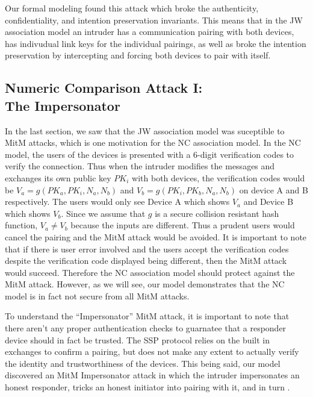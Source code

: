 \documentclass{acm_proc_article-sp}
\begin{document}
Our formal modeling found this attack which broke the authenticity, confidentiality, and intention preservation invariants. This means that in the JW association model an intruder has a communication pairing with both devices, has indivudual link keys for the individual pairings, as well as broke the intention preservation by intercepting and forcing both devices to pair with itself.

\subsection{Numeric Comparison Attack I:\\The Impersonator} 
In the last section, we saw that the JW association model was suceptible to MitM attacks, which is one motivation for the NC association model. In the NC model, the users of the devices is presented with a 6-digit verification codes to verify the connection. Thus when the intruder modifies the messages and exchanges its own public key $PK_i$ with both devices, the verification codes would be $V_a = g(PK_a, PK_i, N_a, N_b)$ and $V_b = g(PK_i, PK_b, N_a, N_b)$ on device A and B respectively. The users would only see Device A which shows $V_a$ and Device B which shows $V_b$. Since we assume that $g$ is a secure collision resistant hash function, $V_a \neq V_b$ because the inputs are different. Thus a prudent users would cancel the pairing and the MitM attack would be avoided. It is important to note that if there is user error involved and the users accept the verification codes despite the verification code displayed being different, then the MitM attack would succeed. Therefore the NC association model should protect against the MitM attack. However, as we will see, our model demonstrates that the NC model is in fact not secure from all MitM attacks.

To understand the ``Impersonator'' MitM attack, it is important to note that there aren't any proper authentication checks to guarnatee that a responder device should in fact be trusted. The SSP protocol relies on the built in exchanges to confirm a pairing, but does not make any extent to actually verify the identity and trustworthiness of the devices. This being said, our model discovered an MitM Impersonator attack in which the intruder impersonates an honest responder, tricks an honest initiator into pairing with it, and in turn .
\end{document}
